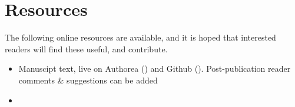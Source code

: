 \section{Resources}

The following online resources are available, and it is hoped that interested readers will find these useful, and contribute.

\begin{itemize}
\item Manuscipt text, live on Authorea () and Github (). Post-publication reader comments \& suggestions can be added
\item 
\end{itemize}